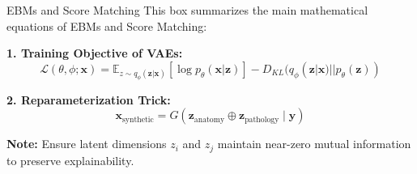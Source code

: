 \begin{summarybox}[label={box:latent_math}]{EBMs and Score Matching}
    This box summarizes the main mathematical equations of EBMs and Score Matching:

    \medskip
    \textbf{1. Training Objective of VAEs:}
    \begin{equation}
        \mathcal{L}(\theta, \phi; \mathbf{x}) = \mathbb{E}_{z\sim q_{\phi}(\mathbf{z}|\mathbf{x})} \left[ \log p_{\theta}(\mathbf{x}|\mathbf{z}) \right] - D_{KL}(q_{\phi}(\mathbf{z}|\mathbf{x}) || p_{\theta}(\mathbf{z}))
    \end{equation}
    
    \medskip
    \textbf{2. Reparameterization Trick:}
    \begin{equation}
        \mathbf{x}_{\text{synthetic}} = G(\mathbf{z}_{\text{anatomy}} \oplus \mathbf{z}_{\text{pathology}} \mid \mathbf{y})
    \end{equation}
    
    {\small \color{boxaccent}\textbf{Note:} Ensure latent dimensions $z_i$ and $z_j$ maintain near-zero mutual information to preserve explainability.}
\end{summarybox} 



